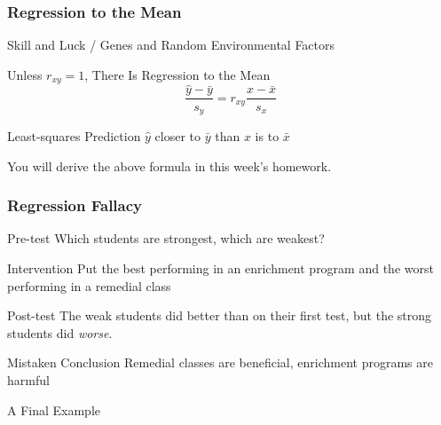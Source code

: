 \documentclass[handout]{beamer}
\begin{document}

\begin{frame}
\frametitle{Regression to the Mean}

\begin{block}{Skill and Luck / Genes and Random Environmental Factors}\end{block}


\begin{block}{Unless $r_{xy}=1$, There Is Regression to the Mean}
$$\frac{\hat{y} - \bar{y}}{{s_y}} = r_{xy} \frac{x - \bar{x}}{s_x}$$
\end{block}

\begin{alertblock}{Least-squares Prediction $\hat{y}$ closer to $\bar{y}$ than $x$ is to $\bar{x}$}
\end{alertblock}
You will derive the above formula in this week's homework.
\end{frame}
\begin{frame}
\frametitle{Regression Fallacy}
\begin{block}{Pre-test}
Which students are strongest, which are weakest?
\end{block}

\begin{block}{Intervention} Put the best performing in an enrichment program and the worst performing in a remedial class
\end{block}

\begin{block}{Post-test}
The weak students did better than on their first test, but the strong students did \emph{worse}.
\end{block}

\begin{block}{Mistaken Conclusion}
Remedial classes are beneficial, enrichment programs are harmful
\end{block}
\end{frame}


\begin{frame}

\centering \Huge A Final Example


\end{frame}


\end{document}
